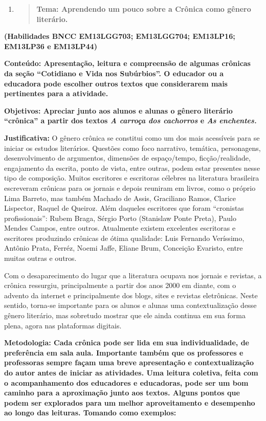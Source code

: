 \begin{enumerate}
\def\labelenumi{\arabic{enumi})}
\item
  \begin{quote}
  \textbf{Tema: Aprendendo um pouco sobre a Crônica como gênero
  literário. }
  \end{quote}
\end{enumerate}

\textbf{(Habilidades BNCC EM13LGG703; EM13LGG704; EM13LP16; EM13LP36 e
EM13LP44)}

\textbf{Conteúdo: Apresentação, leitura e compreensão de algumas
crônicas da seção ``Cotidiano e Vida nos Subúrbios''. O educador ou a
educadora pode escolher outros textos que considerarem mais pertinentes
para a atividade. }

\textbf{Objetivos: Apreciar junto aos alunos e alunas o gênero literário
``crônica'' a partir dos textos \emph{A carroça dos cachorros} e
\emph{As enchentes.} }

\textbf{Justificativa:} O gênero crônica se constitui como um dos mais
acessíveis para se iniciar os estudos literários. Questões como foco
narrativo, temática, personagens, desenvolvimento de argumentos,
dimensões de espaço/tempo, ficção/realidade, engajamento da escrita,
ponto de vista, entre outras, podem estar presentes nesse tipo de
composição. Muitos escritores e escritoras célebres na literatura
brasileira escreveram crônicas para os jornais e depois reuniram em
livros, como o próprio Lima Barreto, mas também Machado de Assis,
Graciliano Ramos, Clarice Lispector, Raquel de Queiroz. Além daqueles
escritores que foram ``cronistas profissionais'': Rubem Braga, Sérgio
Porto (Stanislaw Ponte Preta), Paulo Mendes Campos, entre outros.
Atualmente existem excelentes escritoras e escritores produzindo
crônicas de ótima qualidade: Luis Fernando Veríssimo, Antônio Prata,
Ferréz, Noemi Jaffe, Eliane Brum, Conceição Evaristo, entre muitas
outras e outros.

Com o desaparecimento do lugar que a literatura ocupava nos jornais e
revistas, a crônica ressurgiu, principalmente a partir dos anos 2000 em
diante, com o advento da internet e principalmente dos blogs, sites e
revistas eletrônicas. Neste sentido, torna-se importante para os alunos
e alunas uma contextualização desse gênero literário, mas sobretudo
mostrar que ele ainda continua em sua forma plena, agora nas plataformas
digitais.

\textbf{Metodologia: Cada crônica pode ser lida em sua individualidade,
de preferência em sala aula. Importante também que os professores e
professoras sempre façam uma breve apresentação e contextualização do
autor antes de iniciar as atividades. Uma leitura coletiva, feita com o
acompanhamento dos educadores e educadoras, pode ser um bom caminho para
a aproximação junto aos textos. Alguns pontos que podem ser explorados
para um melhor aproveitamento e desempenho ao longo das leituras.
Tomando como exemplos:}

